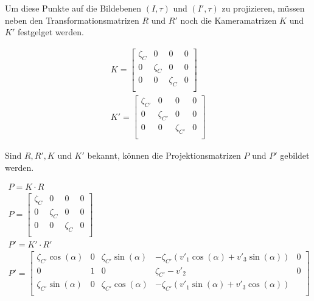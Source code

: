 
 Um diese Punkte auf die Bildebenen $(I,\tau)$ und $(I',\tau)$ zu projizieren, müssen neben den Transformationsmatrizen $R$ und $R'$ noch die Kameramatrizen $K$ und $K'$ festgelget werden.


\begin{gather}		
K =
\begin{bmatrix}
\zeta_{C}&0&0&0\\
0&\zeta_{C}&0&0\\
0&0&\zeta_{C}&0\\
\end{bmatrix}\\
K' =
\begin{bmatrix}
\zeta_{C'}&0&0&0\\
0&\zeta_{C'}&0&0\\
0&0&\zeta_{C'}&0\\
\end{bmatrix}
\end{gather}

Sind $R,R',K$ und $K'$ bekannt, können die Projektionsmatrizen $P$ und $P'$ gebildet werden. 


\begin{gather}
P = K\cdot R \\
P =
\begin{bmatrix}
\zeta_{C}&0&0&0\\
0&\zeta_{C}&0&0\\
0&0&\zeta_{C}&0\\
\end{bmatrix}\\
P' = K' \cdot R'\\
P' =
\begin{bmatrix}
\zeta_{C'} \cos(\alpha)&0&\zeta_{C'} \sin(\alpha)&-\zeta_{C'} (v'_1\cos(\alpha)+v'_3\sin(\alpha) )&0\\
0&1&0&\zeta_{C'}-v'_2&0\\
\zeta_{C'}\sin(\alpha)&0&\zeta_{C'}\cos(\alpha)&-\zeta_{C'}(v'_1\sin(\alpha)+v'_3\cos(\alpha))\\
\end{bmatrix}
\end{gather}



